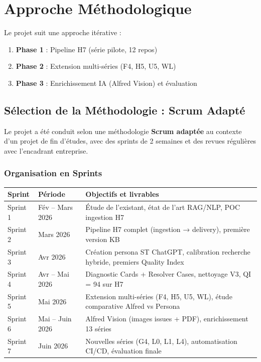 \documentclass[12pt,a4paper]{report}
\begin{document}
\section{Approche Méthodologique}

Le projet suit une approche itérative :
\begin{enumerate}
  \item \textbf{Phase 1} : Pipeline H7 (série pilote, 12 repos)
  \item \textbf{Phase 2} : Extension multi-séries (F4, H5, U5, WL)
  \item \textbf{Phase 3} : Enrichissement IA (Alfred Vision) et évaluation
\end{enumerate}

\subsection{Sélection de la Méthodologie : Scrum Adapté}
\label{sec:scrum}

Le projet a été conduit selon une méthodologie \textbf{Scrum adaptée} au contexte d'un projet de fin d'études, avec des sprints de 2 semaines et des revues régulières avec l'encadrant entreprise.

\subsubsection{Organisation en Sprints}

\begin{longtable}{p{2cm}p{3cm}p{8cm}}
\toprule
\textbf{Sprint} & \textbf{Période} & \textbf{Objectifs et livrables} \\
\midrule
Sprint 1 & Fév -- Mars 2026 & Étude de l'existant, état de l'art RAG/NLP, POC ingestion H7 \\
Sprint 2 & Mars 2026 & Pipeline H7 complet (ingestion → delivery), première version KB \\
Sprint 3 & Avr 2026 & Création persona ST ChatGPT, calibration recherche hybride, premiers Quality Index \\
Sprint 4 & Avr -- Mai 2026 & Diagnostic Cards + Resolver Cases, nettoyage V3, QI = 94 sur H7 \\
Sprint 5 & Mai 2026 & Extension multi-séries (F4, H5, U5, WL), étude comparative Alfred vs Persona \\
Sprint 6 & Mai -- Juin 2026 & Alfred Vision (images issues + PDF), enrichissement 13 séries \\
Sprint 7 & Juin 2026 & Nouvelles séries (G4, L0, L1, L4), automatisation CI/CD, évaluation finale \\
\bottomrule
\end{longtable}
\end{document}
